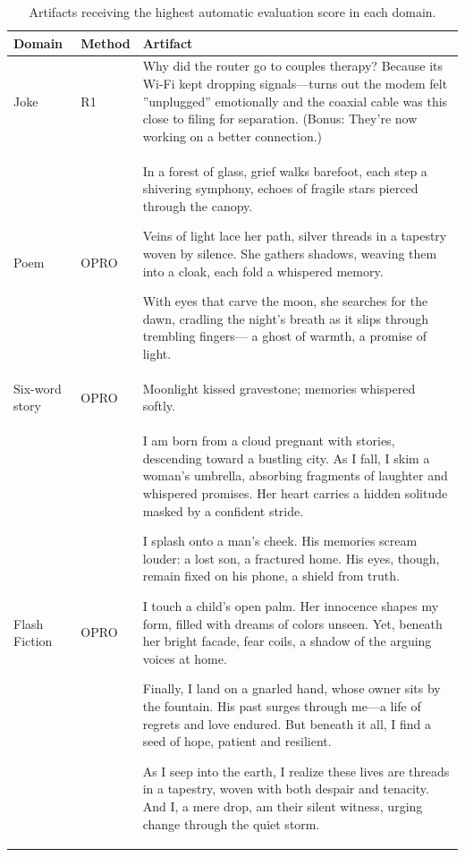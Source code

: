 \documentclass[phd,electronic,oneside,twosidetoc,letterpaper,chaptercenter,parttop,lof]{byumsphd}
\begin{document}
\begin{table}[t!]
\centering
\begin{tabular}{|l|l|p{}|}
\hline
\textbf{Domain} & \textbf{Method} & \textbf{Artifact} \\
\hline
Joke & R1 & Why did the router go to couples therapy? 
Because its Wi-Fi kept dropping signals—turns out the modem felt ''unplugged'' emotionally and the coaxial cable was this close to filing for separation.  
(Bonus: They're now working on a better connection.) \\
\hline
Poem & OPRO & In a forest of glass,  
grief walks barefoot,  
each step a shivering symphony,  
echoes of fragile stars  
pierced through the canopy.

Veins of light lace her path,  
silver threads in a tapestry  
woven by silence.  
She gathers shadows,  
weaving them into a cloak,  
each fold a whispered memory.

With eyes that carve the moon,  
she searches for the dawn,  
cradling the night's breath  
as it slips through trembling fingers—  
a ghost of warmth,  
a promise of light.\\
\hline
Six-word story & OPRO & Moonlight kissed gravestone; memories whispered softly. \\
\hline
Flash Fiction & OPRO & I am born from a cloud pregnant with stories, descending toward a bustling city. As I fall, I skim a woman's umbrella, absorbing fragments of laughter and whispered promises. Her heart carries a hidden solitude masked by a confident stride.

I splash onto a man's cheek. His memories scream louder: a lost son, a fractured home. His eyes, though, remain fixed on his phone, a shield from truth.

I touch a child's open palm. Her innocence shapes my form, filled with dreams of colors unseen. Yet, beneath her bright facade, fear coils, a shadow of the arguing voices at home.

Finally, I land on a gnarled hand, whose owner sits by the fountain. His past surges through me—a life of regrets and love endured. But beneath it all, I find a seed of hope, patient and resilient.

As I seep into the earth, I realize these lives are threads in a tapestry, woven with both despair and tenacity. And I, a mere drop, am their silent witness, urging change through the quiet storm.\\
\hline
\end{tabular}
\caption{Artifacts receiving the highest automatic evaluation score in each domain.}
\label{tab:example-artifacts}
\end{table}
\end{document}
